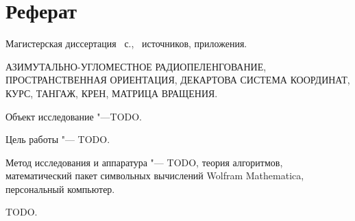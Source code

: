 \documentclass[../main.tex]{subfiles}
\begin{document}
\newpage
\section*{\centering Реферат}

\par\noindent Магистерская диссертация ~с., \ источников,  приложения.\\
\vspace{0.5cm}

\par\noindent АЗИМУТАЛЬНО-УГЛОМЕСТНОЕ РАДИОПЕЛЕНГОВАНИЕ, ПРОСТРАНСТВЕННАЯ ОРИЕНТАЦИЯ, ДЕКАРТОВА СИСТЕМА КООРДИНАТ, КУРС, ТАНГАЖ, КРЕН, МАТРИЦА ВРАЩЕНИЯ.\\

\par\noindent Объект исследование "---TODO.\\
\par\noindent Цель работы "--- TODO.\\
\par\noindent Метод исследования и аппаратура "--- TODO, теория алгоритмов, математический пакет символьных вычислений {\ttfamily Wolfram Mathematica}, персональный компьютер.\\

\par\noindent TODO.

\clearpage
\normalsize
\end{document}
